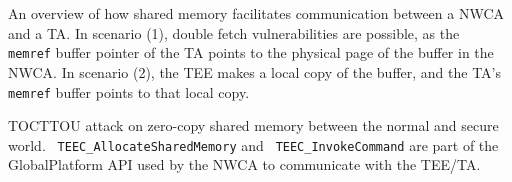 \documentclass[conference]{IEEEtran} %
\providecommand{\DIFdeltex}[1]{{\protect\color{red} \scriptsize #1}} %
\providecommand{\DIFdelbegin}{} %
\providecommand{\DIFdelFL}[1]{\DIFdel{#1}} %
\providecommand{\DIFdel}[1]{\texorpdfstring{\DIFdeltex{#1}}{}} %
\begin{document}
\DIFdelbegin %

{%
\DIFdelFL{An overview of how shared memory facilitates communication between a NWCA and a TA.
    In scenario (1), double fetch vulnerabilities are possible, as the }\texttt{\DIFdelFL{memref}} 
\DIFdelFL{buffer pointer of the TA points to the physical page of the buffer in the NWCA. 
    In scenario (2), the TEE makes a local copy of the buffer, and the TA's }\texttt{\DIFdelFL{memref}} %
\DIFdelFL{buffer 
    points to that local copy.
    }}

{%
\DIFdelFL{TOCTTOU attack on zero-copy shared memory between the normal and secure world.
    }\texttt{\DIFdelFL{TEEC\_AllocateSharedMemory}} %
\DIFdelFL{and }\texttt{\DIFdelFL{TEEC\_InvokeCommand}} %
\DIFdelFL{are part of the GlobalPlatform 
    API used by the NWCA to communicate with the TEE/TA.
    }}
\end{document}
